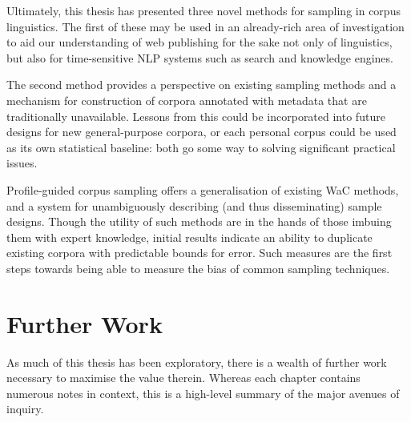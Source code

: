 Ultimately, this thesis has presented three novel methods for sampling in corpus linguistics.  The first of these may be used in an already-rich area of investigation to aid our understanding of web publishing for the sake not only of linguistics, but also for time-sensitive NLP systems such as search and knowledge engines.

The second method provides a perspective on existing sampling methods and a mechanism for construction of corpora annotated with metadata that are traditionally unavailable.  Lessons from this could be incorporated into future designs for new general-purpose corpora, or each personal corpus could be used as its own statistical baseline: both go some way to solving significant practical issues.

Profile-guided corpus sampling offers a generalisation of existing WaC methods, and a system for unambiguously describing (and thus disseminating) sample designs.  Though the utility of such methods are in the hands of those imbuing them with expert knowledge, initial results indicate an ability to duplicate existing corpora with predictable bounds for error.  Such measures are the first steps towards being able to measure the bias of common sampling techniques.








\section{Further Work}
As much of this thesis has been exploratory, there is a wealth of further work necessary to maximise the value therein.  Whereas each chapter contains numerous notes in context, this is a high-level summary of the major avenues of inquiry.



